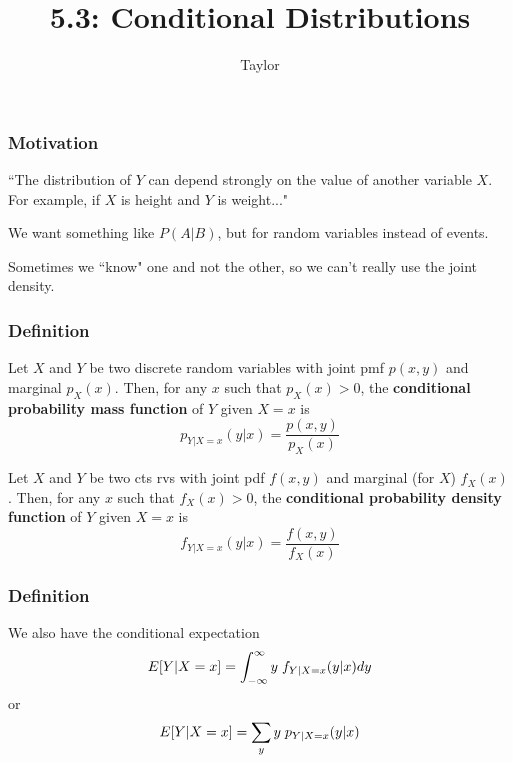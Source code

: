 \documentclass{beamer}
\title["5.3"]{5.3: Conditional Distributions}
\author{Taylor}
\institute[UVA] 
{
University of Virginia \\
\medskip
\textit{} 
}
\date{}
\begin{document}

\begin{frame}
\titlepage 
\end{frame}

\begin{frame}
\frametitle{Motivation}

``The distribution of $Y$ can depend strongly on the value of another variable $X$. For example, if $X$ is height and $Y$ is weight..." 
\newline

We want something like $P(A|B)$, but for random variables instead of events. 
\newline

Sometimes we ``know" one and not the other, so we can't really use the joint density. 
\end{frame}

\begin{frame}
\frametitle{Definition}

Let $X$ and $Y$ be two discrete random variables with joint pmf $p(x,y)$ and marginal $p_X(x)$. Then, for any $x$ such that $p_X(x) > 0$, the \textbf{conditional probability mass function} of $Y$ given $X = x$ is 
\[
p_{Y|X=x}(y|x) = \frac{p(x,y)}{p_X(x)}
\]

Let $X$ and $Y$ be two cts rvs with joint pdf $f(x,y)$ and marginal (for $X$) $f_X(x)$. Then, for any $x$ such that $f_X(x) > 0$, the \textbf{conditional probability density function} of $Y$ given $X = x$ is
\[
f_{Y|X=x}(y|x) = \frac{f(x,y)}{f_X(x)}
\]

\end{frame}

\begin{frame}
\frametitle{Definition}

We also have the conditional expectation
\[
E[Y|X=x] = \int_{-\infty}^{\infty} y \hspace{1mm} f_{Y|X=x}(y|x) dy
\]
or
\[
E[Y|X=x] = \sum_y y \hspace{1mm} p_{Y|X=x}(y|x)
\]

\end{frame}
\end{document}
